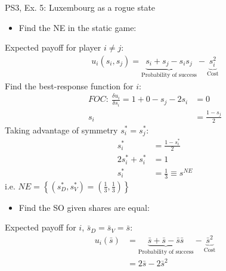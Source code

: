 \begin{frame}{PS3, Ex. 5: Luxembourg as a rogue state}
  \begin{multicols}{2}
    \begin{itemize}
      \item[(a)] Find the NE in the static game:
    \end{itemize}
    Expected payoff for player $i\neq j$:
    \begin{align*}
      u_i(s_i,s_j)=\underbrace{s_i+s_j-s_is_j}_\text{Probability of success}-\underbrace{s_i^2}_\text{Cost}
    \end{align*}
    Find the best-response function for $i$:
    \begin{align*}
      FOC:\ \frac{\delta u_i}{\delta s_i}=1+0-s_j-2s_i&=0\\
       s_i&=\frac{1-s_j}{2}
    \end{align*}
    Taking advantage of symmetry $s_i^{*}=s_j^{*}$:
    \begin{align*}
       s_i^{*}&=\frac{1-s_i^{*}}{2}\\
      2s_i^{*}+s_i^{*}&=1\\
       s_i^{*}&=\frac{1}{3}\equiv s^{NE}
    \end{align*}
    i.e. $NE=\left\{(s_D^{*},s_V^{*})=(\frac{1}{3},\frac{1}{3})\right\}$
  \vfill\null\columnbreak
    \begin{itemize}
      \item[(b)] Find the SO given shares are equal:
    \end{itemize}
    Expected payoff for $i$, $\bar{s}_D=\bar{s}_V=\bar{s}$:
    \begin{align*}
      u_i(\bar{s})&=\underbrace{\bar{s}+\bar{s}-\bar{s}\bar{s}}_\text{Probability of success}-\underbrace{\bar{s}^2}_\text{Cost}\\
                  &=2\bar{s}-2\bar{s}^2
    \end{align*}
  \vfill\null
  \end{multicols}
\end{frame}
